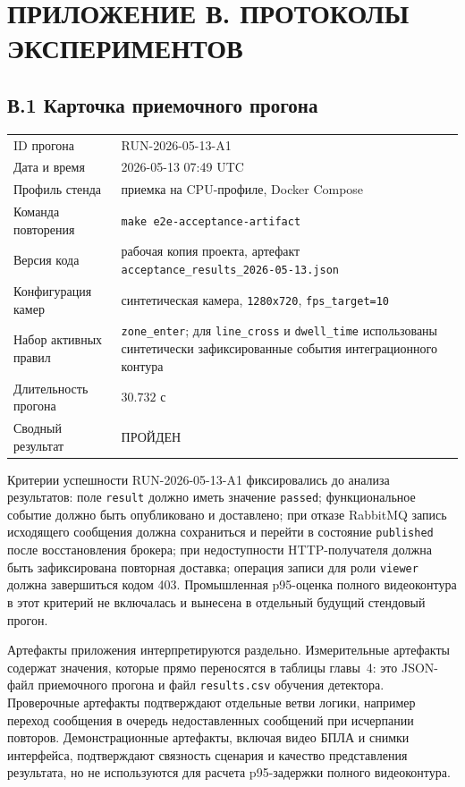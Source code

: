 \chapter*{ПРИЛОЖЕНИЕ В. ПРОТОКОЛЫ ЭКСПЕРИМЕНТОВ}
{}

\section*{В.1 Карточка приемочного прогона}
{}

\begin{longtable}{@{}p{}p{}@{}}
ID прогона & RUN-2026-05-13-A1 \\
Дата и время & 2026-05-13 07:49 UTC \\
Профиль стенда & приемка на CPU-профиле, Docker Compose \\
Команда повторения & \texttt{make e2e-acceptance-artifact} \\
Версия кода & рабочая копия проекта, артефакт \texttt{acceptance\_results\_2026-05-13.json} \\
Конфигурация камер & синтетическая камера, \texttt{1280x720}, \texttt{fps\_target=10} \\
Набор активных правил & \texttt{zone\_enter}; для \texttt{line\_cross} и \texttt{dwell\_time} использованы синтетически зафиксированные события интеграционного контура \\
Длительность прогона & \(30.732\) с \\
Сводный результат & ПРОЙДЕН \\
\end{longtable}

Критерии успешности RUN-2026-05-13-A1 фиксировались до анализа результатов: поле \texttt{result} должно иметь значение \texttt{passed}; функциональное событие должно быть опубликовано и доставлено; при отказе RabbitMQ запись исходящего сообщения должна сохраниться и перейти в состояние \texttt{published} после восстановления брокера; при недоступности HTTP-получателя должна быть зафиксирована повторная доставка; операция записи для роли \texttt{viewer} должна завершиться кодом 403. Промышленная p95-оценка полного видеоконтура в этот критерий не включалась и вынесена в отдельный будущий стендовый прогон.

Артефакты приложения интерпретируются раздельно. Измерительные артефакты содержат значения, которые прямо переносятся в таблицы главы~4: это JSON-файл приемочного прогона и файл \texttt{results.csv} обучения детектора. Проверочные артефакты подтверждают отдельные ветви логики, например переход сообщения в очередь недоставленных сообщений при исчерпании повторов. Демонстрационные артефакты, включая видео БПЛА и снимки интерфейса, подтверждают связность сценария и качество представления результата, но не используются для расчета p95-задержки полного видеоконтура.

